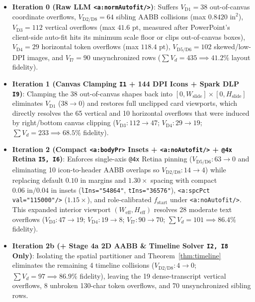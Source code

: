\documentclass[10pt,journal,compsoc]{IEEEtran}
\begin{document}
\begin{itemize}
    \item \textbf{Iteration 0 (Raw LLM \texttt{<a:normAutofit/>})}: Suffers $V_{\text{D1}}=38$ out-of-canvas coordinate overflows, $V_{\text{D2/D8}}=64$ sibling AABB collisions (max $0.8420\text{ in}^2$), $V_{\text{D3}}=112$ vertical overflows (max $41.6\text{ pt}$, measured after PowerPoint's client-side auto-fit hits its minimum scale floor or clips out-of-canvas boxes), $V_{\text{D4}}=29$ horizontal token overflows (max $118.4\text{ pt}$), $V_{\text{D5/D6}}=102$ skewed/low-DPI images, and $V_{\text{I7}}=90$ unsynchronized rows ($\sum V_d = 435 \implies 41.2\%$ layout fidelity).
    \item \textbf{Iteration 1 (Canvas Clamping \texttt{I1} + 144 DPI Icons + Spark DLP \texttt{I9})}: Clamping the 38 out-of-canvas shapes back into $[0, W_{\text{slide}}] \times [0, H_{\text{slide}}]$ eliminates $V_{\text{D1}}$ ($38 \to 0$) and restores full unclipped card viewports, which directly resolves the 65 vertical and 10 horizontal overflows that were induced by right/bottom canvas clipping ($V_{\text{D3}}: 112 \to 47$; $V_{\text{D4}}: 29 \to 19$; $\sum V_d = 233 \implies 68.5\%$ fidelity).
    \item \textbf{Iteration 2 (Compact \texttt{<a:bodyPr>} Insets + \texttt{<a:noAutofit/>} + \texttt{@4x} Retina \texttt{I5, I6})}: Enforces single-axis \texttt{@4x} Retina pinning ($V_{\text{D5/D6}}: 63 \to 0$ and eliminating 10 icon-to-header AABB overlaps so $V_{\text{D2/D8}}: 14 \to 4$) while replacing default $0.10\text{ in}$ margins and $1.30\times$ spacing with compact $0.06\text{ in}/0.04\text{ in}$ insets (\texttt{lIns="54864"}, \texttt{tIns="36576"}), \texttt{<a:spcPct val="115000"/>} ($1.15\times$), and role-calibrated $f_{\text{start}}$ under \texttt{<a:noAutofit/>}. This expanded interior viewport $(W_{\text{eff}}, H_{\text{eff}})$ resolves 28 moderate text overflows ($V_{\text{D3}}: 47 \to 19$; $V_{\text{D4}}: 19 \to 8$; $V_{\text{I7}}: 90 \to 70$; $\sum V_d = 101 \implies 86.4\%$ fidelity).
    \item \textbf{Iteration 2b (+ Stage 4a 2D AABB \& Timeline Solver \texttt{I2, I8} Only)}: Isolating the spatial partitioner and Theorem~\ref{thm:timeline} eliminates the remaining 4 timeline collisions ($V_{\text{D2/D8}}: 4 \to 0$; $\sum V_d = 97 \implies 86.9\%$ fidelity), leaving the 19 dense-transcript vertical overflows, 8 unbroken 130-char token overflows, and 70 unsynchronized sibling rows.

\end{itemize}
\end{document}
